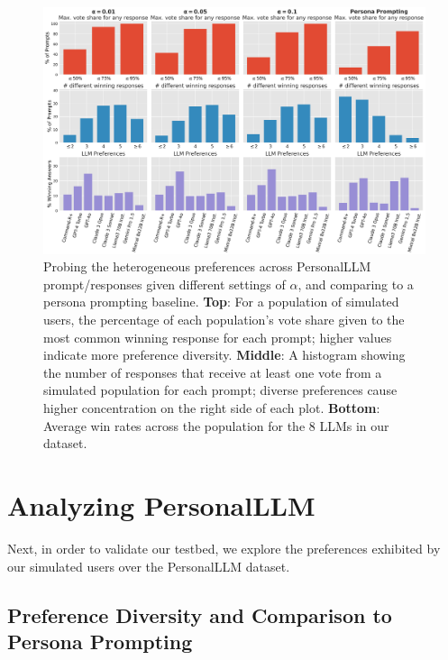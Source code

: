 \begin{figure}[!ht]
    \centering 
    \includegraphics[width=\linewidth]{../figures/persona_prompting_comparison.png}
    \caption{Probing the heterogeneous preferences across \textsf{PersonalLLM} prompt/responses given different settings of $\alpha$, and comparing to a persona prompting baseline.  \textbf{Top}: For a population of simulated users, the percentage of each population's vote share given to the most common winning response for each prompt; higher values indicate more preference diversity. \textbf{Middle}: A histogram showing the number of responses that receive at least one vote from a simulated population for each prompt; diverse preferences cause higher concentration on the right side of each plot. \textbf{Bottom}: Average win rates across the population for the 8 LLMs in our dataset.}
    \label{fig:persona_diversity}
\end{figure}

\section{Analyzing PersonalLLM}\label{sec:persona_analysis}

Next, in order to validate our testbed, we explore the preferences exhibited by our simulated users over the \textsf{PersonalLLM} dataset.  

\subsection{Preference Diversity and Comparison to Persona Prompting}

